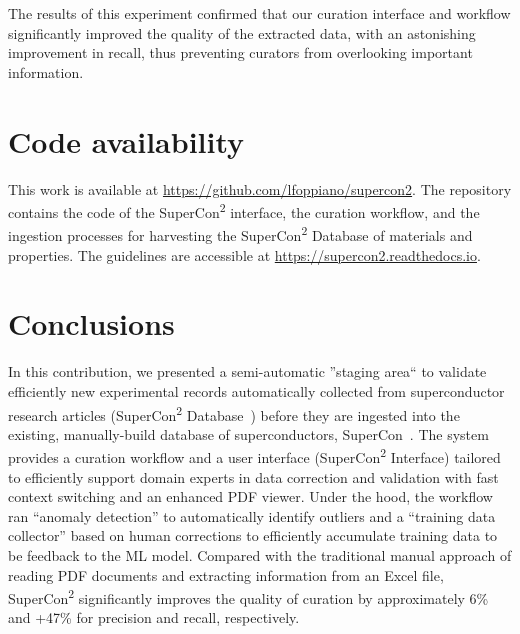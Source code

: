 The results of this experiment confirmed that our curation interface and workflow significantly improved the quality of the extracted data, with an astonishing improvement in recall, thus preventing curators from overlooking important information.

\section{Code availability}
This work is available at \url{https://github.com/lfoppiano/supercon2}. The repository contains the code of the SuperCon\textsuperscript{2} interface, the curation workflow, and the ingestion processes for harvesting the SuperCon\textsuperscript{2} Database of materials and properties. The guidelines are accessible at \url{https://supercon2.readthedocs.io}.


\section{Conclusions}

In this contribution, we presented a semi-automatic ''staging area`` to validate efficiently new experimental records automatically collected from superconductor research articles (SuperCon\textsuperscript{2} Database~\cite{foppiano2023automatic}) before they are ingested into the existing, manually-build database of superconductors, SuperCon~\cite{ishii2023structuring}.
The system provides a curation workflow and a user interface (SuperCon\textsuperscript{2} Interface) tailored to efficiently support domain experts in data correction and validation with fast context switching and an enhanced PDF viewer.
Under the hood, the workflow ran ``anomaly detection'' to automatically identify outliers and a ``training data collector'' based on human corrections to efficiently accumulate training data to be feedback to the ML model. 
Compared with the traditional manual approach of reading PDF documents and extracting information from an Excel file, SuperCon\textsuperscript{2} significantly improves the quality of curation by approximately 6\% and +47\% for precision and recall, respectively.

